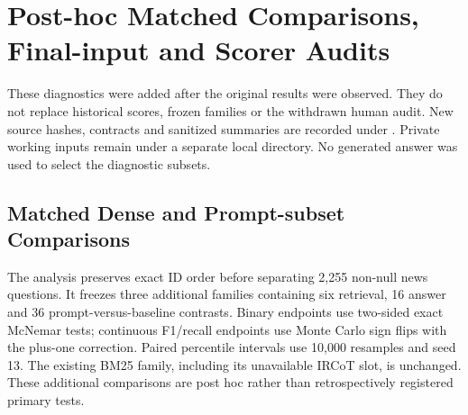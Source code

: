 \section{Post-hoc Matched Comparisons, Final-input and Scorer Audits}
\label{sec:supp_priority_diagnostics}

These diagnostics were added after the original results were observed. They do not replace historical scores, frozen families or the withdrawn human audit. New source hashes, contracts and sanitized summaries are recorded under . Private working inputs remain under a separate local directory. No generated answer was used to select the diagnostic subsets.

\subsection{Matched Dense and Prompt-subset Comparisons}
The analysis preserves exact ID order before separating 2,255 non-null news questions. It freezes three additional families containing six retrieval, 16 answer and 36 prompt-versus-baseline contrasts. Binary endpoints use two-sided exact McNemar tests; continuous F1/recall endpoints use Monte Carlo sign flips with the plus-one correction. Paired percentile intervals use 10,000 resamples and seed 13. The existing BM25 family, including its unavailable IRCoT slot, is unchanged. These additional comparisons are post hoc rather than retrospectively registered primary tests.

